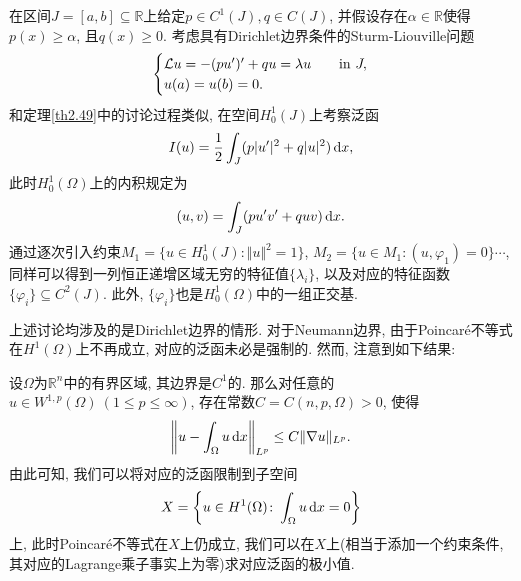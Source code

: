 \begin{example}
    在区间$J = [a, b] \subseteq \mathbb{R}$上给定$p \in C^1(J), q \in C(J)$, 并假设存在$\alpha \in \mathbb{R}$使得$p(x) \geq \alpha$, 且$q(x) \geq 0$.
    考虑具有Dirichlet边界条件的Sturm-Liouville问题 
    \begin{equation*}
        \begin{cases}
            \mathcal{L}u = -(pu')' + qu = \lambda u \quad &{\rm in}\ J, \\ 
            u(a) = u(b) = 0.
        \end{cases}
    \end{equation*}
    和定理\ref{th2.49}中的讨论过程类似, 在空间$H_0^1(J)$上考察泛函 
    \begin{equation*}
        I(u) = \frac{1}{2}\int_J(p|u'|^2 + q|u|^2) \,{\rm d}x,
    \end{equation*}
    此时$H_0^1(\Omega)$上的内积规定为 
    \begin{equation*}
        (u, v) = \int_J(pu'v' + quv) \,{\rm d}x.
    \end{equation*}
    通过逐次引入约束$M_1 = \{u \in H_0^1(J)\colon \Vert u \Vert^2 = 1\}$, $M_2 = \{u \in M_1\colon (u, \varphi_1) = 0\} \cdots$, 同样可以得到一列恒正递增区域无穷的特征值$\{\lambda_i\}$, 以及对应的特征函数$\{\varphi_i\} \subseteq C^2(J)$.
    此外, $\{\varphi_i\}$也是$H_0^1(\Omega)$中的一组正交基.
\end{example}

\begin{remark}
    上述讨论均涉及的是Dirichlet边界的情形. 对于Neumann边界, 由于Poincar\'e不等式在$H^1(\Omega)$上不再成立, 对应的泛函未必是强制的.
    然而, 注意到如下结果:
    \begin{proposition}[Poincaré不等式]
        设$\Omega$为$\mathbb{R}^n$中的有界区域, 其边界是$C^1$的. 那么对任意的$u \in W^{1, p}(\Omega)\ (1 \leq p \leq \infty)$, 存在常数$C = C(n, p, \Omega) > 0$, 使得 
        \begin{equation*}
            \left\Vert u - \int_{\Omega}u \,{\rm d}x \right\Vert_{L^p} \leq C\Vert \nabla u \Vert_{L^p}.
        \end{equation*}
        由此可知, 我们可以将对应的泛函限制到子空间 
        \begin{equation*}
            X = \left\{u \in H^1(\Omega)\colon \int_{\Omega}u \,{\rm d}x = 0\right\}
        \end{equation*}
        上, 此时Poincaré不等式在$X$上仍成立, 我们可以在$X$上(相当于添加一个约束条件, 其对应的Lagrange乘子事实上为零)求对应泛函的极小值.
    \end{proposition}
\end{remark}

